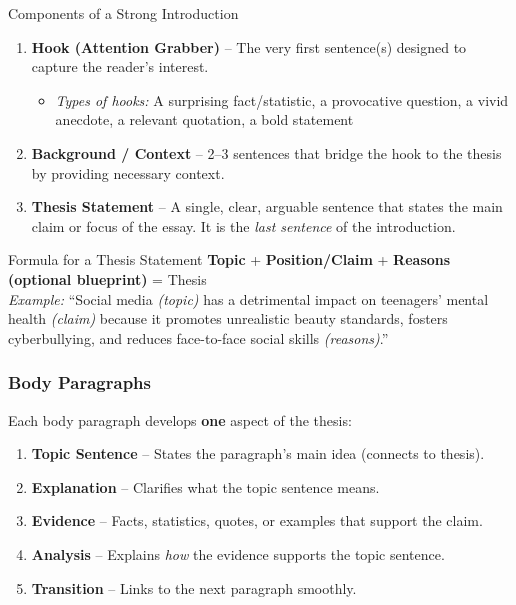\documentclass[12pt,a4paper]{article}
\begin{document}
\begin{keybox}{Components of a Strong Introduction}
\begin{enumerate}
    \item \textbf{Hook (Attention Grabber)} -- The very first sentence(s) designed to capture the reader's interest.
    \begin{itemize}[noitemsep]
        \item \textit{Types of hooks:} A surprising fact/statistic, a provocative question, a vivid anecdote, a relevant quotation, a bold statement
    \end{itemize}
    \item \textbf{Background / Context} -- 2--3 sentences that bridge the hook to the thesis by providing necessary context.
    \item \textbf{Thesis Statement} -- A single, clear, arguable sentence that states the main claim or focus of the essay. It is the \textit{last sentence} of the introduction.
\end{enumerate}
\end{keybox}

\begin{tipbox}{Formula for a Thesis Statement}
\textbf{Topic} + \textbf{Position/Claim} + \textbf{Reasons (optional blueprint)} = Thesis\\[0.3cm]
\textit{Example:} ``Social media \textit{(topic)} has a detrimental impact on teenagers' mental health \textit{(claim)} because it promotes unrealistic beauty standards, fosters cyberbullying, and reduces face-to-face social skills \textit{(reasons)}.''
\end{tipbox}

\subsubsection{Body Paragraphs}

Each body paragraph develops \textbf{one} aspect of the thesis:

\begin{enumerate}[noitemsep]
    \item \textbf{Topic Sentence} -- States the paragraph's main idea (connects to thesis).
    \item \textbf{Explanation} -- Clarifies what the topic sentence means.
    \item \textbf{Evidence} -- Facts, statistics, quotes, or examples that support the claim.
    \item \textbf{Analysis} -- Explains \textit{how} the evidence supports the topic sentence.
    \item \textbf{Transition} -- Links to the next paragraph smoothly.
\end{enumerate}
\end{document}
